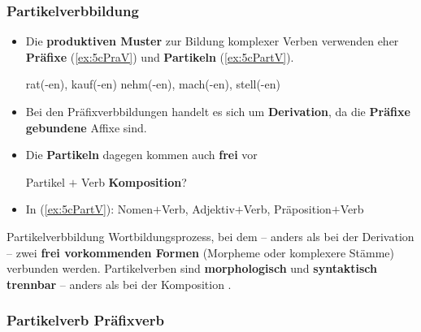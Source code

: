 \begin{frame}
\frametitle{Partikelverbbildung}

\begin{itemize}
\item Die \textbf{produktiven Muster} zur Bildung komplexer Verben verwenden eher \textbf{Präfixe} (\ref{ex:5cPraV}) und \textbf{Partikeln} (\ref{ex:5cPartV}).

\ea 
\ea\label{ex:5cPraV} rat(-en), kauf(-en)
\ex\label{ex:5cPartV} nehm(-en), mach(-en), stell(-en)
\z 
\z 

\item Bei den Präfixverbbildungen handelt es sich um \textbf{Derivation}, da die \textbf{Präfixe} \textbf{gebundene} Affixe sind.


\item Die \textbf{Partikeln} dagegen kommen auch \textbf{frei} vor

\medskip

Partikel $+$ Verb \ras \textbf{Komposition}?

\item In (\ref{ex:5cPartV}): Nomen$+$Verb, Adjektiv$+$Verb, Präposition$+$Verb

\end{itemize}

\end{frame}



\begin{frame}{Partikelverbbildung}
Wortbildungsprozess, bei dem -- anders als bei der Derivation -- zwei \textbf{frei vorkommenden Formen} (Morpheme oder komplexere Stämme) verbunden werden. Partikelverben sind \textbf{morphologisch} und \textbf{syntaktisch trennbar} -- anders als bei der Komposition . 
\end{frame}



\subsubsection{Partikelverb \vs Präfixverb}

